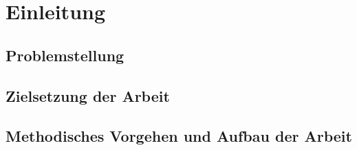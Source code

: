 \section{Einleitung}
\subsection{Problemstellung}
\subsection{Zielsetzung der Arbeit}
\subsection{Methodisches Vorgehen und Aufbau der Arbeit}
